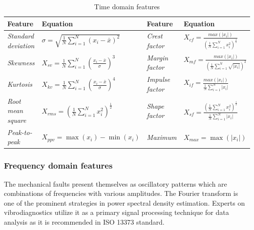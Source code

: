 \begin{table}[h]
\renewcommand{\arraystretch}{1.5}
\begin{adjustbox}{width=\columnwidth,center}
\begin{tabular}{|l|l|l|l|}
\hline
\textbf{Feature}            & \textbf{Equation}                                                                    & \textbf{Feature}        & \textbf{Equation}                                                                                                  \\ \hline
\textit{Standard deviation} & $ \sigma = \sqrt{\frac{1}{N}\sum_{i = 1}^{N}{\left(x_i - \bar{x}\right)^2}} $        & \textit{Crest factor}   & $ X_{cf} = \frac{max(|x_i|)}{\left( \frac{1}{N} \sum_{i=1}^{N}{x_i^2} \right)^\frac{1}{2}} $                       \\ \hline
\textit{Skewness}           & $ X_{sv} = \frac{1}{N}\sum_{i = 1}^{N}{\left(\frac{x_i - \bar{x}}{\sigma}\right)^3}$ & \textit{Margin factor}  & $ X_{mf} = \frac{max(|x_i|)}{\left( \frac{1}{N} \sum_{i=1}^{N}{\sqrt{|x_i|}} \right)^2} $                          \\ \hline
\textit{Kurtosis}           & $ X_{kv} = \frac{1}{N}\sum_{i = 1}^{N}{\left(\frac{x_i - \bar{x}}{\sigma}\right)^4}$ & \textit{Impulse factor} & $ X_{if} = \frac{max(|x_i|)}{\frac{1}{N} \sum_{i=1}^{N}{|x_i|}} $                                                  \\ \hline
\textit{Root mean square}   & $ X_{rms} = \left(\frac{1}{N}\sum_{i = 1}^{N}{x_i^2}\right)^\frac{1}{2}$             & \textit{Shape factor}   & $ X_{sf} = \frac{\left( \frac{1}{N} \sum_{i=1}^{N}{x_i^2} \right)^\frac{1}{2}}{\frac{1}{N} \sum_{i=1}^{N}{|x_i|}}$ \\ \hline
\textit{Peak-to-peak}       & $ X_{ppv} = \max(x_i) - \min(x_i) $                                                  & \textit{Maximum}        & $ X_{max} = \max(|x_i|) $                                                                                          \\ \hline
\end{tabular}
\end{adjustbox}
\caption{Time domain features}
\label{tab:td-features}
\end{table}

\subsubsection{Frequency domain features}
The mechanical faults present themselves as oscillatory patterns which are combinations of frequencies with various amplitudes. The Fourier transform is one of the prominent strategies in power spectral density estimation. Experts on vibrodiagnostics utilize it as a primary signal processing technique for data analysis as it is recommended in ISO 13373 standard. 

